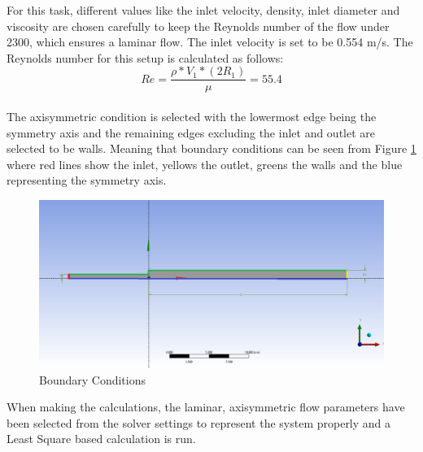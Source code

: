 \begin{task1}
\noindent For this task, different values like the inlet velocity, density, inlet diameter and viscosity are chosen carefully to keep the Reynolds number of the flow under 2300, which ensures a laminar flow. The inlet velocity is set to be 0.554 m/s. The Reynolds number for this setup is calculated as follows:
\begin{equation} \label{eq:reynolds}
     Re = \frac{\rho * V_1 * (2R_1)}{\mu} = 55.4
\end{equation}
\\

\noindent The axisymmetric condition is selected with the lowermost edge being the symmetry axis and the remaining edges excluding the inlet and outlet are selected to be walls. Meaning that boundary conditions can be seen from Figure \ref{fig:boundary} where red lines show the inlet, yellows the outlet, greens the walls and the blue representing the symmetry axis. \\


\begin{figure}[h]
    \centering
    \includegraphics[width=15cm]{images/task1/sketch_paint.png}
    \caption{Boundary Conditions}
    \label{fig:boundary}
\end{figure}

\noindent When making the calculations, the laminar, axisymmetric flow parameters have been selected from the solver settings to represent the system properly and a Least Square based calculation is run.















\end{task1}